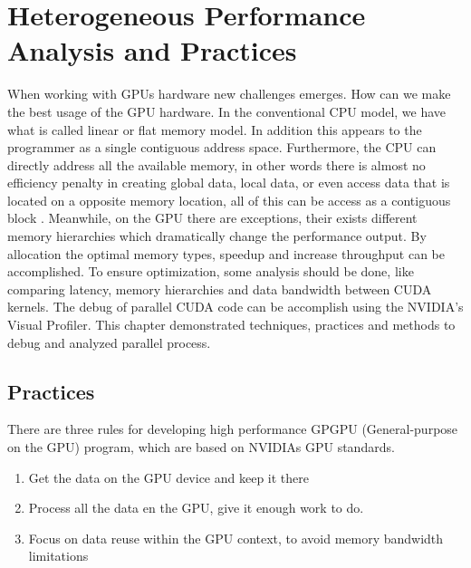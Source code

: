 \chapter{Heterogeneous Performance Analysis and Practices} %

\label{Heterogeneous Performance Analysis and Practices} %

When working with GPUs hardware new challenges emerges. How can we make the best usage of the GPU hardware. In the conventional CPU model, we have what is called linear or flat memory model. In addition this appears to the programmer as a single contiguous address space. Furthermore, the CPU can directly address all the available memory, in other words there is almost no efficiency penalty in creating global data, local data, or even access data that is located on a opposite memory location, all of this can be access as a contiguous block \cite{cook}. Meanwhile, on the GPU there are exceptions, their exists different memory hierarchies which dramatically change the performance output. By allocation the optimal memory types, speedup and increase throughput can be accomplished. To ensure optimization, some analysis should be done, like comparing latency, memory hierarchies and data bandwidth between CUDA kernels. The debug of parallel CUDA code can be accomplish using the NVIDIA's Visual Profiler. This chapter demonstrated techniques, practices and methods to debug and analyzed parallel process.

\section{Practices}

There are three rules for developing high performance GPGPU (General-purpose on the GPU) program, which are based on NVIDIAs GPU standards. \cite{design}

\begin{enumerate}
  \item Get the data on the GPU device and keep it there
  \item Process all the data en the GPU, give it enough work to do.
  \item Focus on data reuse within the GPU context, to avoid memory bandwidth limitations
\end{enumerate}

